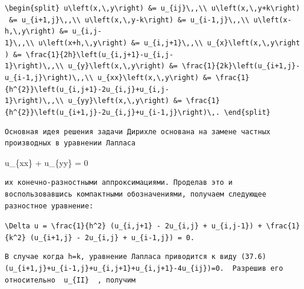 \documentclass[
  ukrainian,
]{article}
\begin{document}
\texttt{\textbackslash{}begin\{split\}\ u\textbackslash{}left(x,\textbackslash{},y\textbackslash{}right)\ \&=\ u\_\{ij\}\textbackslash{},,\textbackslash{}\textbackslash{}\ u\textbackslash{}left(x,\textbackslash{},y+k\textbackslash{}right)\ \&=\ u\_\{i+1,j\}\textbackslash{},,\textbackslash{}\textbackslash{}\ u\textbackslash{}left(x,\textbackslash{},y-k\textbackslash{}right)\ \&=\ u\_\{i-1,j\}\textbackslash{},,\textbackslash{}\textbackslash{}\ u\textbackslash{}left(x-h,\textbackslash{},y\textbackslash{}right)\ \&=\ u\_\{i,j-1\}\textbackslash{},,\textbackslash{}\textbackslash{}\ u\textbackslash{}left(x+h,\textbackslash{},y\textbackslash{}right)\ \&=\ u\_\{i,j+1\}\textbackslash{},,\textbackslash{}\textbackslash{}\ u\_\{x\}\textbackslash{}left(x,\textbackslash{},y\textbackslash{}right)\ \&=\ \textbackslash{}frac\{1\}\{2h\}\textbackslash{}left(u\_\{i,j+1\}-u\_\{i,j-1\}\textbackslash{}right)\textbackslash{},,\textbackslash{}\textbackslash{}\ u\_\{y\}\textbackslash{}left(x,\textbackslash{},y\textbackslash{}right)\ \&=\ \textbackslash{}frac\{1\}\{2k\}\textbackslash{}left(u\_\{i+1,j\}-u\_\{i-1,j\}\textbackslash{}right)\textbackslash{},,\textbackslash{}\textbackslash{}\ u\_\{xx\}\textbackslash{}left(x,\textbackslash{},y\textbackslash{}right)\ \&=\ \textbackslash{}frac\{1\}\{h\^{}\{2\}\}\textbackslash{}left(u\_\{i,j+1\}-2u\_\{i,j\}+u\_\{i,j-1\}\textbackslash{}right)\textbackslash{},,\textbackslash{}\textbackslash{}\ u\_\{yy\}\textbackslash{}left(x,\textbackslash{},y\textbackslash{}right)\ \&=\ \textbackslash{}frac\{1\}\{h\^{}\{2\}\}\textbackslash{}left(u\_\{i+1,j\}-2u\_\{i,j\}+u\_\{i-1,j\}\textbackslash{}right)\textbackslash{},.\ \textbackslash{}end\{split\}}

\begin{verbatim}
Основная идея решения задачи Дирихле основана на замене частных производных в уравнении Лапласа
\end{verbatim}

u\_\{xx\} + u\_\{yy\} = 0

\begin{verbatim}
их конечно-разностными аппроксимациями. Проделав это и воспользовавшись компактными обозначениями, получаем следующее разностное уравнение:
\end{verbatim}

\texttt{\textbackslash{}Delta\ u\ =\ \textbackslash{}frac\{1\}\{h\^{}2\}\ (u\_\{i,j+1\}\ -\ 2u\_\{i,j\}\ +\ u\_\{i,j-1\})\ +\ \textbackslash{}frac\{1\}\{k\^{}2\}\ (u\_\{i+1,j\}\ -\ 2u\_\{i,j\}\ +\ u\_\{i-1,j\})\ =\ 0.}

\begin{verbatim}
В случае когда h=k, уравнение Лапласа приводится к виду (37.6)  (u_{i+1,j}+u_{i-1,j}+u_{i,j+1}+u_{i,j+1}-4u_{ij})=0.  Разрешив его относительно  u_{II}  , получим
\end{verbatim}
\end{document}

